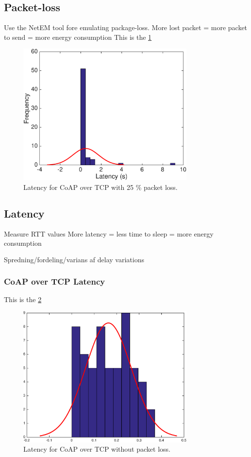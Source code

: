 \subsection{Packet-loss}
Use the NetEM tool fore emulating package-loss.
More lost packet = more packet to send = more energy consumption
This is the \figurename \ref{coapovertcploss}
\begin{figure}[bh]
	\centering
	\includegraphics[width=3.5in]{gfx/coapovertcp25loss}
	\caption{Latency for CoAP over TCP with 25 \% packet loss.}
	\label{coapovertcploss}
\end{figure}

\subsection{Latency}
Measure RTT values %
More latency = less time to sleep = more energy consumption

Spredning/fordeling/varians af delay variations 

\subsubsection{CoAP over TCP Latency}
This is the \figurename \ref{fig_sim}
\begin{figure}[bh]
\centering
\includegraphics[width=3.5in]{gfx/coapovertcp}
\caption{Latency for CoAP over TCP without packet loss.}
\label{fig_sim}
\end{figure}

